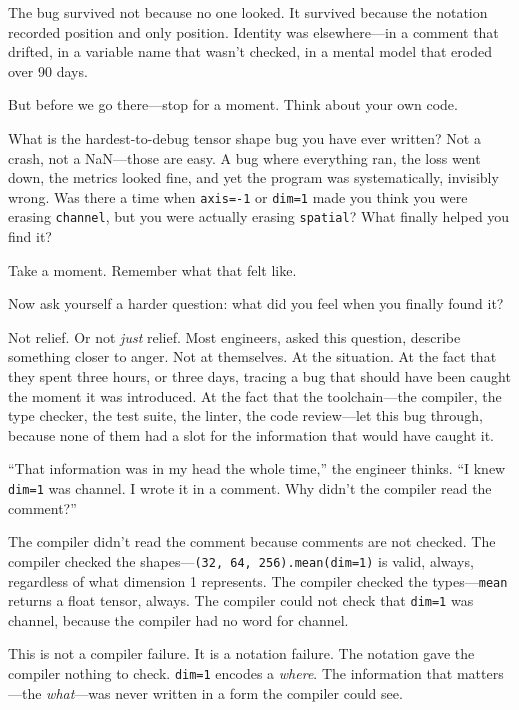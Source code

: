 \documentclass[11pt,titlepage]{article}
\begin{document}
The bug survived not because no one looked. It survived because the
notation recorded position and only position. Identity was
elsewhere---in a comment that drifted, in a variable name that wasn't
checked, in a mental model that eroded over 90 days.

\vspace{2em}

But before we go there---stop for a moment. Think about your own code.

What is the hardest-to-debug tensor shape bug you have ever written? Not
a crash, not a NaN---those are easy. A bug where everything ran, the
loss went down, the metrics looked fine, and yet the program was
systematically, invisibly wrong. Was there a time when \texttt{axis=-1}
or \texttt{dim=1} made you think you were erasing \texttt{channel}, but
you were actually erasing \texttt{spatial}? What finally helped you find
it?

Take a moment. Remember what that felt like.

Now ask yourself a harder question: what did you feel when you finally
found it?

Not relief. Or not \emph{just} relief. Most engineers, asked this
question, describe something closer to anger. Not at themselves. At the
situation. At the fact that they spent three hours, or three days,
tracing a bug that should have been caught the moment it was introduced.
At the fact that the toolchain---the compiler, the type checker, the
test suite, the linter, the code review---let this bug through, because
none of them had a slot for the information that would have caught it.

``That information was in my head the whole time,'' the engineer thinks.
``I knew \texttt{dim=1} was channel. I wrote it in a comment. Why didn't
the compiler read the comment?''

The compiler didn't read the comment because comments are not checked.
The compiler checked the shapes---\texttt{(32,\ 64,\ 256).mean(dim=1)}
is valid, always, regardless of what dimension 1 represents. The
compiler checked the types---\texttt{mean} returns a float tensor,
always. The compiler could not check that \texttt{dim=1} was channel,
because the compiler had no word for channel.

This is not a compiler failure. It is a notation failure. The notation
gave the compiler nothing to check. \texttt{dim=1} encodes a
\emph{where}. The information that matters---the \emph{what}---was never
written in a form the compiler could see.
\end{document}
